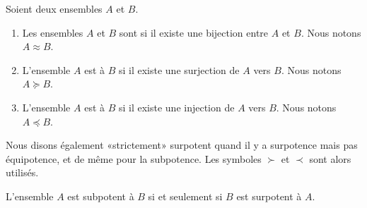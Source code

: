 \begin{definition}      \label{DEFooXGXZooIgcBCg}
    Soient deux ensembles \( A\) et \( B\).
    \begin{enumerate}
        \item
            Les ensembles \( A\) et \( B\) sont  si il existe une bijection entre \( A\) et \( B\). Nous notons \( A\approx B\).
        \item
            L'ensemble \( A\) est  à \( B\) si il existe une surjection de \( A\) vers \( B\). Nous notons \( A\succeq B\).
        \item
            L'ensemble \( A\) est  à \( B\) si il existe une injection de \( A\) vers \( B\). Nous notons \( A\preceq B\).
    \end{enumerate}
    Nous disons également «strictement» surpotent quand il y a surpotence mais pas équipotence, et de même pour la subpotence. Les symboles \( \succ\) et \( \prec\) sont alors utilisés.
\end{definition}

\begin{proposition}      \label{PROPooWSXTooMQPcNG}
    L'ensemble \( A\) est subpotent à \( B\) si et seulement si \( B\) est surpotent à \( A\).
\end{proposition}

